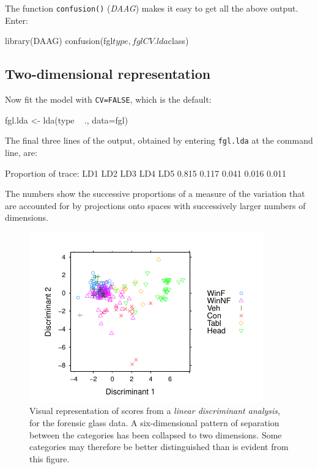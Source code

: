 \documentclass{tufte-book}\usepackage[]{graphicx}\usepackage[]{color}
\newcommand{\txtt}[1]{\texttt{#1}}
\begin{document}
The function \txtt{confusion()} (\textit{DAAG}) makes it easy to
get all the above output.  Enter:
\begin{Schunk}
\begin{Sinput}
library(DAAG)
confusion(fgl$type, fglCV.lda$class)
\end{Sinput}
\end{Schunk}

\subsection*{Two-dimensional representation}

Now fit the model with \txtt{CV=FALSE}, which is the default:
\begin{Schunk}
\begin{Sinput}
fgl.lda <- lda(type ~ ., data=fgl)
\end{Sinput}
\end{Schunk}
The final three lines of the output, obtained by entering
\txtt{fgl.lda} at the command line, are:
\begin{Schunk}
\begin{Soutput}
Proportion of trace:
  LD1   LD2   LD3   LD4   LD5
0.815 0.117 0.041 0.016 0.011
\end{Soutput}
\end{Schunk}
The numbers 
show the successive proportions of a measure of the
variation that are accounted for by projections onto spaces with
successively larger numbers of dimensions.  


\begin{figure}
\begin{Schunk}


\centerline{\includegraphics[width=0.9\textwidth]{figs/9-fgl-scores2D-1} }

\end{Schunk}
\caption{Visual representation of scores from a
  {\em linear discriminant analysis}, for the forensic glass data.  A
  six-dimensional pattern of separation between the categories has
  been collapsed to two dimensions.  Some categories may therefore
be better distinguished than is evident from this figure.\label{fig:fgl}}
\end{figure}
\end{document}
